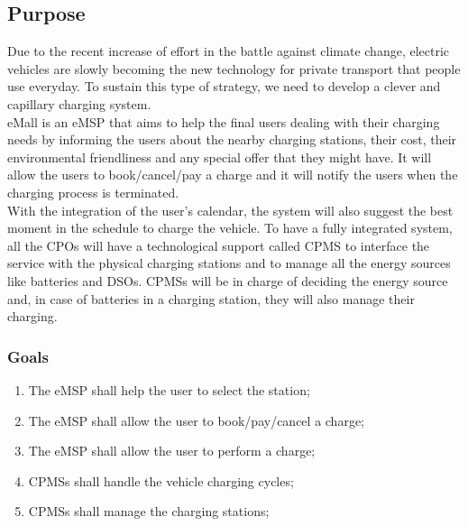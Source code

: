 


\subsection{Purpose}
Due to the recent increase of effort in the battle against climate change, electric vehicles are slowly becoming the new technology for private transport that   people use everyday.
To sustain this type of strategy, we need to develop a clever and capillary charging system.\\
\ac{eMall} is an \ac{eMSP} that aims to help the final users dealing with their charging needs by informing the users about the nearby charging stations, their cost, their environmental friendliness and any special offer that they might have.
It will allow the users to book/cancel/pay a charge and it will notify the users when the charging process is terminated.\\
With the integration of the user's calendar, the system will also suggest the best moment in the schedule to charge the vehicle.
To have a fully integrated system, all the \acp{CPO} will have a technological support called \ac{CPMS} to interface the service with the physical charging stations and to manage all the energy sources like batteries and \acp{DSO}.
\acp{CPMS} will be in charge of deciding the energy source and, in case of batteries in a charging station, they will also manage their charging.
\subsubsection{Goals}
%
\begin{enumerate}[label=\textbf{G\arabic*}]
    \item The \ac{eMSP} shall help the user to select the station;\label{goal:eMSP-helps-selecting}
    \item The \ac{eMSP} shall allow the user to book/pay/cancel a charge;\label{goal:eMSP-booking-charge}
    \item The \ac{eMSP} shall allow the user to perform a charge;\label{goal:eMSP-allow-charge}
    \item \acp{CPMS} shall handle the vehicle charging cycles;\label{goal:CPMS-handles-charge}
    \item \acp{CPMS} shall manage the charging stations;\label{goal:CPMS-manage-station}
\end{enumerate}

